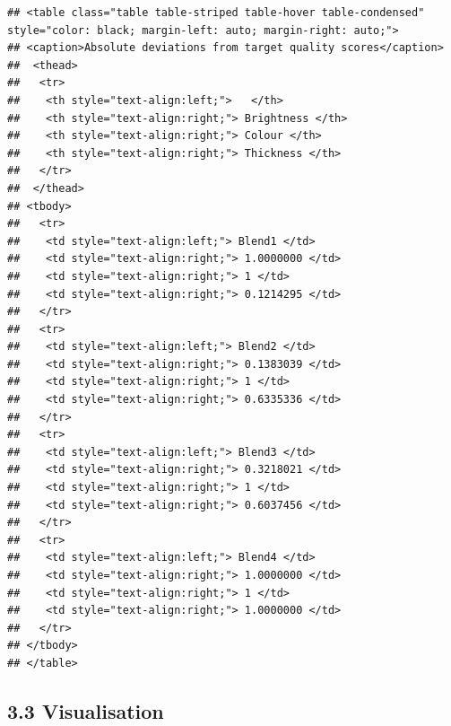 \documentclass[
]{article}
\begin{document}
\begin{verbatim}
## <table class="table table-striped table-hover table-condensed" style="color: black; margin-left: auto; margin-right: auto;">
## <caption>Absolute deviations from target quality scores</caption>
##  <thead>
##   <tr>
##    <th style="text-align:left;">   </th>
##    <th style="text-align:right;"> Brightness </th>
##    <th style="text-align:right;"> Colour </th>
##    <th style="text-align:right;"> Thickness </th>
##   </tr>
##  </thead>
## <tbody>
##   <tr>
##    <td style="text-align:left;"> Blend1 </td>
##    <td style="text-align:right;"> 1.0000000 </td>
##    <td style="text-align:right;"> 1 </td>
##    <td style="text-align:right;"> 0.1214295 </td>
##   </tr>
##   <tr>
##    <td style="text-align:left;"> Blend2 </td>
##    <td style="text-align:right;"> 0.1383039 </td>
##    <td style="text-align:right;"> 1 </td>
##    <td style="text-align:right;"> 0.6335336 </td>
##   </tr>
##   <tr>
##    <td style="text-align:left;"> Blend3 </td>
##    <td style="text-align:right;"> 0.3218021 </td>
##    <td style="text-align:right;"> 1 </td>
##    <td style="text-align:right;"> 0.6037456 </td>
##   </tr>
##   <tr>
##    <td style="text-align:left;"> Blend4 </td>
##    <td style="text-align:right;"> 1.0000000 </td>
##    <td style="text-align:right;"> 1 </td>
##    <td style="text-align:right;"> 1.0000000 </td>
##   </tr>
## </tbody>
## </table>
\end{verbatim}

\subsection{3.3 Visualisation}\label{visualisation}
\end{document}
